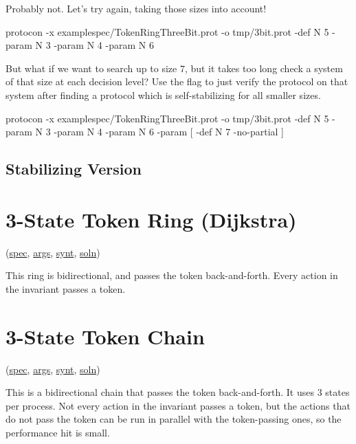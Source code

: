 Probably not.
Let's try again, taking those sizes into account!
\begin{code}
protocon -x examplespec/TokenRingThreeBit.prot -o tmp/3bit.prot -def N 5 -param N 3 -param N 4 -param N 6
\end{code}

But what if we want to search up to size $7$, but it takes too long check a system of that size at each decision level?
Use the  flag to just verify the protocol on that system after finding a protocol which is self-stabilizing for all smaller sizes.
\begin{code}
protocon -x examplespec/TokenRingThreeBit.prot -o tmp/3bit.prot -def N 5 -param N 3 -param N 4 -param N 6 -param [ -def N 7 -no-partial ]
\end{code}

\subsection{Stabilizing Version}


\section{3-State Token Ring (Dijkstra)}
\label{sec:TokenRingThreeState}

(\href{\examplespec/TokenRingThreeState.prot}{spec},
\href{\examplesett/TokenRingThreeState.args}{args},
\href{\examplesynt/TokenRingThreeState.prot}{synt},
\href{\examplesoln/TokenRingThreeState.prot}{soln})

This ring is bidirectional, and passes the token back-and-forth.
Every action in the invariant passes a token.

\section{3-State Token Chain}
\label{sec:TokenChainThreeState}

(\href{\examplespec/TokenChain.prot}{spec},
\href{\examplesett/TokenChainThreeState.args}{args},
\href{\examplesynt/TokenChain.prot}{synt},
\href{\examplesoln/TokenChainThreeState.prot}{soln})

This is a bidirectional chain that passes the token back-and-forth.
It uses 3 states per process.
Not every action in the invariant passes a token, but the actions that do not pass the token can be run in parallel with the token-passing ones, so the performance hit is small.


